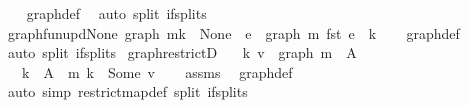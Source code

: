 \begin{isabellebody}
%
\isadelimproof
\ \ %
\endisadelimproof
%
\isatagproof
{}\isamarkupfalse%
\ graph{\isacharunderscore}{\kern0pt}def\ \isamarkupfalse%
\ {\isacharparenleft}{\kern0pt}auto\ split{\isacharcolon}{\kern0pt}\ if{\isacharunderscore}{\kern0pt}splits{\isacharparenright}{\kern0pt}%
\endisatagproof
{\isafoldproof}%
%
\isadelimproof
\isanewline
%
\endisadelimproof
\isanewline
{}\isamarkupfalse%
\ graph{\isacharunderscore}{\kern0pt}fun{\isacharunderscore}{\kern0pt}upd{\isacharunderscore}{\kern0pt}None{\isacharcolon}{\kern0pt}\ {\isachardoublequoteopen}graph\ {\isacharparenleft}{\kern0pt}m{\isacharparenleft}{\kern0pt}k\ {\isacharcolon}{\kern0pt}{\isacharequal}{\kern0pt}\ None{\isacharparenright}{\kern0pt}{\isacharparenright}{\kern0pt}\ {\isacharequal}{\kern0pt}\ {\isacharbraceleft}{\kern0pt}e\ {\isasymin}\ graph\ m{\isachardot}{\kern0pt}\ fst\ e\ {\isasymnoteq}\ k{\isacharbraceright}{\kern0pt}{\isachardoublequoteclose}\isanewline
%
\isadelimproof
\ \ %
\endisadelimproof
%
\isatagproof
{}\isamarkupfalse%
\ graph{\isacharunderscore}{\kern0pt}def\ \isamarkupfalse%
\ {\isacharparenleft}{\kern0pt}auto\ split{\isacharcolon}{\kern0pt}\ if{\isacharunderscore}{\kern0pt}splits{\isacharparenright}{\kern0pt}%
\endisatagproof
{\isafoldproof}%
%
\isadelimproof
\isanewline
%
\endisadelimproof
\isanewline
{}\isamarkupfalse%
\ graph{\isacharunderscore}{\kern0pt}restrictD{\isacharcolon}{\kern0pt}\isanewline
\ \ \ {\isachardoublequoteopen}{\isacharparenleft}{\kern0pt}k{\isacharcomma}{\kern0pt}\ v{\isacharparenright}{\kern0pt}\ {\isasymin}\ graph\ {\isacharparenleft}{\kern0pt}m\ {\isacharbar}{\kern0pt}{\isacharbackquote}{\kern0pt}\ A{\isacharparenright}{\kern0pt}{\isachardoublequoteclose}\isanewline
\ \ \ {\isachardoublequoteopen}k\ {\isasymin}\ A{\isachardoublequoteclose}\ \ {\isachardoublequoteopen}m\ k\ {\isacharequal}{\kern0pt}\ Some\ v{\isachardoublequoteclose}\isanewline
%
\isadelimproof
\ \ %
\endisadelimproof
%
\isatagproof
{}\isamarkupfalse%
\ assms\ \isamarkupfalse%
\ graph{\isacharunderscore}{\kern0pt}def\isanewline
\ \ \isamarkupfalse%
\ {\isacharparenleft}{\kern0pt}auto\ simp{\isacharcolon}{\kern0pt}\ restrict{\isacharunderscore}{\kern0pt}map{\isacharunderscore}{\kern0pt}def\ split{\isacharcolon}{\kern0pt}\ if{\isacharunderscore}{\kern0pt}splits{\isacharparenright}{\kern0pt}%
\endisatagproof
{\isafoldproof}%
%
\isadelimproof
\isanewline
%
\endisadelimproof
\isanewline
{}\isamarkupfalse%

\end{isabellebody}
